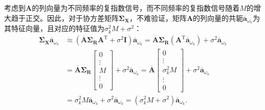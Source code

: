 考虑到\( \mathbf{A} \)的列向量为不同频率的复指数信号，而不同频率的复指数信号随着\( M \)的增大趋于正交。因此，对于协方差矩阵\( \mathbf{\Sigma}_{\mathbf{X}} \)，不难验证，矩阵\( \mathbf{A} \)的列向量的共轭\( \overline{\bm{a}}_{\omega_k} \)为其特征向量，且对应的特征值为\( \sigma_k^2 M + \sigma^2 \)：
\[
    \begin{split}
        \mathbf{\Sigma}_{\mathbf{X}} \overline{\bm{a}}_{\omega_k}
         & \approx \left( \overline{\mathbf{A}} \mathbf{\Sigma}_{\mathbf{R}} \mathbf{A}^{\mathrm{T}} + \sigma^2 \mathbf{I} \right) \overline{\bm{a}}_{\omega_k}
        = \overline{\mathbf{A}} \mathbf{\Sigma}_{\mathbf{R}} \left( \mathbf{A}^{\mathrm{T}} \overline{\bm{a}}_{\omega_k} \right) + \sigma^2 \overline{\bm{a}}_{\omega_k}                            \\
         & = \overline{\mathbf{A}} \mathbf{\Sigma}_{\mathbf{R}} \begin{bmatrix}
                                                                    0      \\
                                                                    \vdots \\
                                                                    M      \\
                                                                    \vdots \\
                                                                    0
                                                                \end{bmatrix} + \sigma^2 \overline{\bm{a}}_{\omega_k} = \overline{\mathbf{A}} \begin{bmatrix}
                                                                                                                                                  0            \\
                                                                                                                                                  \vdots       \\
                                                                                                                                                  \sigma_k^2 M \\
                                                                                                                                                  \vdots       \\
                                                                                                                                                  0
                                                                                                                                              \end{bmatrix} + \sigma^2 \overline{\bm{a}}_{\omega_k} \\
         & = \sigma_k^2 M \overline{\bm{a}}_{\omega_k} + \sigma^2 \overline{\bm{a}}_{\omega_k}
        = \left( \sigma_k^2 M + \sigma^2 \right) \overline{\bm{a}}_{\omega_k}.
    \end{split}
\]
